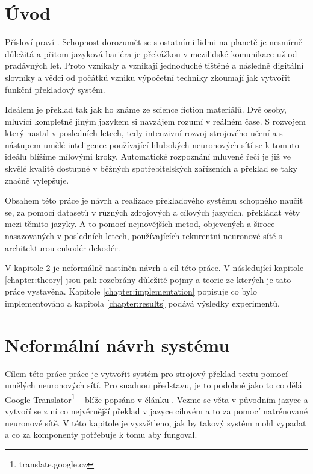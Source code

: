 \chapter{Úvod}
Přísloví praví . Schopnost dorozumět se s ostatními lidmi na planetě je nesmírně důležitá a přitom jazyková bariéra je překážkou v mezilidské komunikace už od pradávných let. Proto vznikaly a vznikají jednoduché tištěné a následně digitální slovníky a vědci od počátků vzniku výpočetní techniky zkoumají jak vytvořit funkční překladový systém.

Ideálem je překlad tak jak ho známe ze science fiction materiálů. Dvě osoby, mluvící kompletně jiným jazykem si navzájem rozumí v reálném čase. S rozvojem který nastal v posledních letech, tedy intenzivní rozvoj strojového učení a s nástupem umělé inteligence používající hlubokých neuronových sítí se k tomuto ideálu blížíme mílovými kroky. Automatické rozpoznání mluvené řeči je již ve skvělé kvalitě dostupné v běžných spotřebitelských zařízeních a překlad se taky značně vylepšuje.

Obsahem této práce je návrh a realizace překladového systému schopného naučit se, za pomocí datasetů v různých zdrojových a cílových jazycích, překládat věty mezi těmito jazyky. A to pomocí nejnovějších metod, objevených a široce nasazovaných v posledních letech, používajících rekurentní neuronové sítě s architekturou enkodér-dekodér.

V kapitole \ref{chapter:draft} je neformálně nastíněn návrh a cíl této práce. V následující kapitole \ref{chapter:theory} jsou pak rozebrány důležité pojmy a teorie ze kterých je tato práce vystavěna. Kapitole \ref{chapter:implementation} popisuje co bylo implementováno a kapitola \ref{chapter:results} podává výsledky experimentů.

\chapter{Neformální návrh systému} \label{chapter:draft}
Cílem této práce práce je vytvořit systém pro strojový překlad textu pomocí umělých neuronových sítí. Pro snadnou představu, je to podobné jako to co dělá Google Translator\footnote{translate.google.cz} -- blíže popsáno v článku \cite{googleBridgingGap}. Vezme se věta v původním jazyce a vytvoří se z ní co nejvěrnější překlad v jazyce cílovém a to za pomocí natrénované neuronové sítě. V této kapitole je vysvětleno, jak by takový systém mohl vypadat a co za komponenty potřebuje k tomu aby fungoval.

